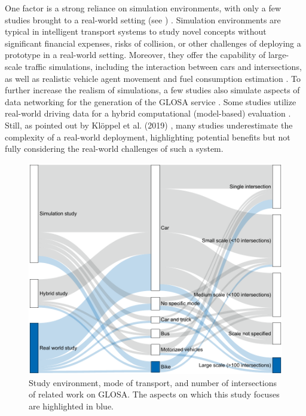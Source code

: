 One factor is a strong reliance on simulation environments, with only a few studies brought to a real-world setting (see ) \cite{mellegard_day_2020}. Simulation environments are typical in intelligent transport systems to study novel concepts without significant financial expenses, risks of collision, or other challenges of deploying a prototype in a real-world setting. Moreover, they offer the capability of large-scale traffic simulations, including the interaction between cars and intersections, as well as realistic vehicle agent movement and fuel consumption estimation \cite{kloeppel_performance_2019, pariota_green_2019}. To further increase the realism of simulations, a few studies also simulate aspects of data networking for the generation of the GLOSA service \cite{sharara_impact_2019}. Some studies utilize real-world driving data for a hybrid computational (model-based) evaluation \cite{raubitschek_predictive_2011, luo_green_2017, xie_dynamic_2021, bhattacharyya_assessing_2022}. Still, as pointed out by Klöppel et al. (2019) \cite{kloeppel_performance_2019}, many studies underestimate the complexity of a real-world deployment, highlighting potential benefits but not fully considering the real-world challenges of such a system.

\begin{figure}
\centering
\includegraphics[width=\linewidth]{images/related-work-sankey.pdf}
\caption{Study environment, mode of transport, and number of intersections of related work on GLOSA. The aspects on which this study focuses are highlighted in blue.}
\label{fig:related-work-piechart}
\end{figure}

